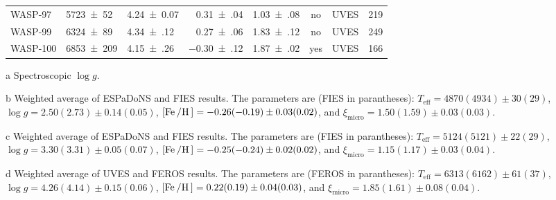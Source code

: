 \documentclass[fleqn]{fcup-thesis}
\newcommand{\object}[1]{#1}
\DeclareRobustCommand{\ion}[2]{\textup{#1\,\textsc{\lowercase{#2}}}}
\begin{document}
\begin{landscape}
\begin{ThreePartTable}
\begin{longtable}{lllrlclr}
        \object{WASP-97}        &   \num{5723(52)}    &  \num{4.24(7)}              &  \num{ 0.31(04)}  &  \num{1.03(08)}  & no   &  UVES             &  219  \\[5pt]
        \object{WASP-99}        &   \num{6324(89)}    &  \num{4.34(12)}             &  \num{ 0.27(06)}  &  \num{1.83(12)}  & no   &  UVES             &  249  \\
        \object{WASP-100}       &   \num{6853(209)}   &  \num{4.15(26)}\tnote{a}    &  \num{-0.30(12)}  &  \num{1.87(02)}  & yes  &  UVES             &  166  \\
    \hline
  \end{longtable}
    \begin{tablenotes}
      \item [a] Spectroscopic $\log g$.
      \item [b] Weighted average of ESPaDoNS and FIES results.
                The parameters are (FIES in parantheses):
                $T_\mathrm{eff}=4870(4934)\pm30(29)$,
                $\log g=2.50(2.73)\pm0.14(0.05)$,
                $[\ion{Fe}/\ion{H}]=-0.26(-0.19)\pm0.03(0.02)$, and
                $\xi_\mathrm{micro}=1.50(1.59)\pm0.03(0.03)$.
      \item [c] Weighted average of ESPaDoNS and FIES results.
                The parameters are (FIES in parantheses):
                $T_\mathrm{eff}=5124(5121)\pm22(29)$,
                $\log g=3.30(3.31)\pm0.05(0.07)$,
                $[\ion{Fe}/\ion{H}]=-0.25(-0.24)\pm0.02(0.02)$, and
                $\xi_\mathrm{micro}=1.15(1.17)\pm0.03(0.04)$.
      \item [d] Weighted average of UVES and FEROS results.
                The parameters are (FEROS in parantheses):
                $T_\mathrm{eff}=6313(6162)\pm61(37)$,
                $\log g=4.26(4.14)\pm0.15(0.06)$,
                $[\ion{Fe}/\ion{H}]=0.22(0.19)\pm0.04(0.03)$, and
                $\xi_\mathrm{micro}=1.85(1.61)\pm0.08(0.04)$.
    \end{tablenotes}
  \end{ThreePartTable}


\end{landscape}
\end{document}
